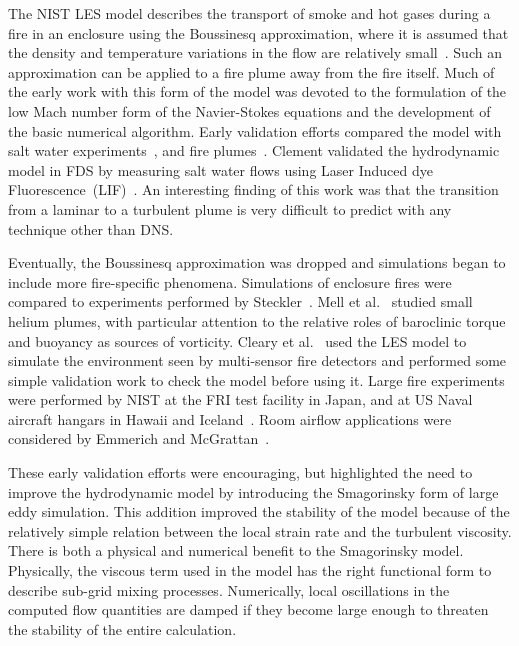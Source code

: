 The NIST LES model describes the transport of smoke and hot gases during a fire in an enclosure using the Boussinesq approximation, where it is assumed that the density and temperature variations in the flow are relatively small~\cite{Rehm:1,Rehm:SIAM83,Rehm:ANM85,Rehm:IAFSS3}. Such an approximation can be applied to a fire plume away from the fire itself. Much of the early work with this form of the model was devoted to the formulation of the low Mach number form of the Navier-Stokes equations and the development of the basic numerical algorithm.  Early validation efforts compared the model with salt water experiments~\cite{Baum:1,McGrattan:1,Rehm:IAFSS5},  and fire plumes~\cite{Baum:IAFSS5,Baum:2,Baum:3,Baum:4}. Clement validated the hydrodynamic model in FDS by measuring salt water flows using Laser Induced dye  Fluorescence~(LIF)~\cite{Clement:1}. An  interesting finding of this work was that the transition from a laminar to a turbulent plume is very difficult to predict with any technique other than DNS.

Eventually, the Boussinesq approximation was dropped and simulations began to  include more fire-specific  phenomena. Simulations of enclosure  fires  were  compared  to experiments  performed  by Steckler~\cite{McGrattan:4}. Mell et al.~\cite{Mell:1} studied small helium plumes, with particular attention to the relative roles of baroclinic torque and buoyancy as sources of vorticity. Cleary et al.~\cite{LES:6} used  the LES model to simulate the environment seen by multi-sensor fire detectors and performed some simple validation work to check the model before using it. Large fire experiments were performed by NIST at the FRI test facility in Japan, and at US Naval aircraft hangars in Hawaii and Iceland~\cite{Davis:1}. Room  airflow  applications  were  considered by  Emmerich  and McGrattan~\cite{Emmerich:1,Emmerich:2}.

These early validation efforts were encouraging, but highlighted the need to improve the hydrodynamic model by introducing the Smagorinsky form of large eddy simulation. This addition improved the stability of the model because of the relatively simple relation between the local strain rate and the turbulent viscosity. There is both  a  physical and  numerical  benefit  to the  Smagorinsky model. Physically, the viscous term used in the model has the right functional form to describe sub-grid mixing processes. Numerically, local oscillations in the computed flow quantities are damped if they become large  enough to threaten the stability  of the entire calculation.






